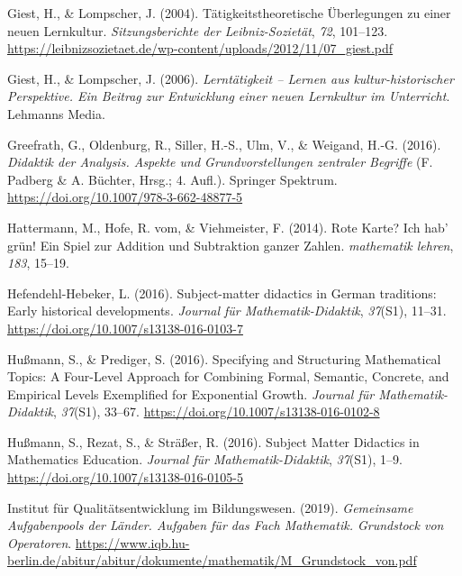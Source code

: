 \documentclass[
  ngerman,
]{scrbook}
\newlength{\cslhangindent}
\newlength{\cslentryspacingunit} %
\newenvironment{CSLReferences}[2] %
 {%
  \setlength{\parindent}{0pt}
  \ifodd #1
  \let\oldpar\par
  \def\par{\hangindent=\cslhangindent\oldpar}
  \fi
  \setlength{\parskip}{#2\cslentryspacingunit}
 }%
 {}
\theoremstyle{definition}
\theoremstyle{definition}
\theoremstyle{definition}
\theoremstyle{definition}
\theoremstyle{remark}
\begin{document}
\begin{CSLReferences}{1}{0}
\leavevmode{}%
Giest, H., \& Lompscher, J. (2004). Tätigkeitstheoretische Überlegungen zu einer neuen {Lernkultur}. \emph{Sitzungsberichte der Leibniz-Sozietät}, \emph{72}, 101--123. \url{https://leibnizsozietaet.de/wp-content/uploads/2012/11/07_giest.pdf}

\leavevmode{}%
Giest, H., \& Lompscher, J. (2006). \emph{Lerntätigkeit -- {Lernen} aus kultur-historischer {Perspektive}. {Ein} {Beitrag} zur {Entwicklung} einer neuen {Lernkultur} im {Unterricht}}. Lehmanns Media.

\leavevmode{}%
Greefrath, G., Oldenburg, R., Siller, H.-S., Ulm, V., \& Weigand, H.-G. (2016). \emph{Didaktik der {Analysis}. {Aspekte} und {Grundvorstellungen} zentraler {Begriffe}} (F. Padberg \& A. Büchter, Hrsg.; 4. Aufl.). Springer Spektrum. \url{https://doi.org/10.1007/978-3-662-48877-5}

\leavevmode{}%
Hattermann, M., Hofe, R. vom, \& Viehmeister, F. (2014). Rote {Karte}? {Ich} hab' grün! {Ein} {Spiel} zur {Addition} und {Subtraktion} ganzer {Zahlen}. \emph{mathematik lehren}, \emph{183}, 15--19.

\leavevmode{}%
Hefendehl-Hebeker, L. (2016). Subject-matter didactics in {German} traditions: {Early} historical developments. \emph{Journal für Mathematik-Didaktik}, \emph{37}(S1), 11--31. \url{https://doi.org/10.1007/s13138-016-0103-7}

\leavevmode{}%
Hußmann, S., \& Prediger, S. (2016). Specifying and Structuring Mathematical Topics: A Four-Level Approach for Combining Formal, Semantic, Concrete, and Empirical Levels Exemplified for Exponential Growth. \emph{Journal für Mathematik-Didaktik}, \emph{37}(S1), 33--67. \url{https://doi.org/10.1007/s13138-016-0102-8}

\leavevmode{}%
Hußmann, S., Rezat, S., \& Sträßer, R. (2016). Subject {Matter} {Didactics} in {Mathematics} {Education}. \emph{Journal für Mathematik-Didaktik}, \emph{37}(S1), 1--9. \url{https://doi.org/10.1007/s13138-016-0105-5}

\leavevmode{}%
Institut für Qualitätsentwicklung im Bildungswesen. (2019). \emph{Gemeinsame {Aufgabenpools} der {Länder}. {Aufgaben} für das {Fach} {Mathematik}. {Grundstock} von {Operatoren}}. \url{https://www.iqb.hu-berlin.de/abitur/abitur/dokumente/mathematik/M_Grundstock_von.pdf}


\end{CSLReferences}
\end{document}
